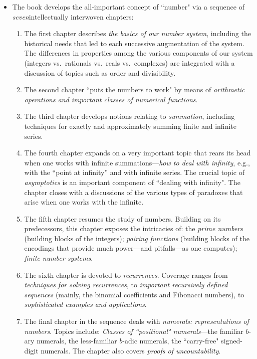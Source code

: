 \documentclass{article}[12pt]
\begin{document}
\begin{itemize}
\begin{itemize}
  \item
The book develops the all-important concept of ``number" via a sequence of {\em seven}intellectually interwoven chapters:
   \begin{enumerate}
   \item       
The first chapter describes {\em the basics of our number system}, including the historical needs that led to each successive augmentation of the system.  The differences in properties among the various components of our system (integers vs.~rationals vs.~reals vs.~complexes) are integrated with a discussion of topics such as order and divisibility.
  \item
The second chapter ``puts the numbers to work" by means of {\em arithmetic operations and important classes of numerical functions}.
  \item
The third chapter develops notions relating to {\em summation}, including techniques for exactly and approximately summing finite and infinite series.
  \item
The fourth chapter expands on a very important topic that rears its head when one works with infinite summations---{\em how to deal with infinity}, e.g.,  with the ``point at infinity'' and with infinite series.  The crucial topic of {\em asymptotics} is an important component of ``dealing with infinity".  The chapter closes with a discussions of the various types of paradoxes that arise when one works with the infinite.
  \item
The fifth chapter resumes the study of numbers.  Building on its predecessors, this chapter exposes the intricacies of: the {\em prime numbers} (building blocks of the integers); {\em pairing functions} (building blocks of the encodings that provide much power---and pitfalls---as one computes); {\em finite number systems}.
  \item
The sixth chapter is devoted to {\em recurrences}.  Coverage ranges from {\em techniques for solving recurrences}, to {\em important recursively defined sequences} (mainly, the binomial coefficients and Fibonacci numbers), to {\em sophisticated examples and applications}.
  \item
The final chapter in the sequence deals with {\em numerals: representations of numbers}.  Topics include: {\em Classes of ``positional" numerals}---the familiar $b$-ary numerals, the less-familiar $b$-adic numerals, the ``carry-free" signed-digit numerals.  The chapter also covers {\em proofs of uncountability}.  
\end{enumerate}


\end{itemize}
\end{itemize}
\end{document}
